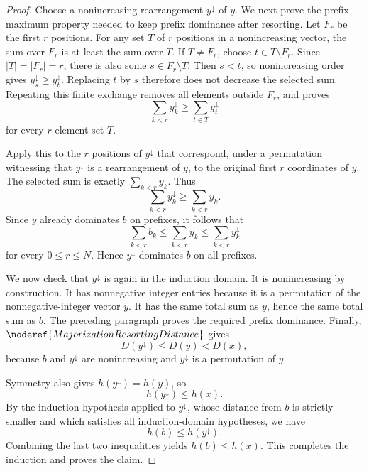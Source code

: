 \begin{proof}
Choose a nonincreasing rearrangement \(y^\downarrow\) of \(y\).  We next
prove the prefix-maximum property needed to keep prefix dominance after
resorting.  Let \(F_r\) be the first \(r\) positions.  For any set \(T\) of
\(r\) positions in a nonincreasing vector, the sum over \(F_r\) is at least
the sum over \(T\).  If \(T\ne F_r\), choose
\(t\in T\setminus F_r\).  Since \(|T|=|F_r|=r\), there is also some
\(s\in F_r\setminus T\).  Then \(s<t\), so nonincreasing order gives
\(y^\downarrow_s\ge y^\downarrow_t\).  Replacing \(t\) by \(s\) therefore
does not decrease the selected sum.  Repeating this finite exchange removes
all elements outside \(F_r\), and proves
\[
\sum_{k<r} y^\downarrow_k
\ge
\sum_{t\in T} y^\downarrow_t
\]
for every \(r\)-element set \(T\).

Apply this to the \(r\) positions of \(y^\downarrow\) that correspond, under
a permutation witnessing that \(y^\downarrow\) is a rearrangement of \(y\),
to the original first \(r\) coordinates of \(y\).  The selected sum is
exactly \(\sum_{k<r}y_k\).  Thus
\[
\sum_{k<r} y^\downarrow_k\ge \sum_{k<r} y_k.
\]
Since \(y\) already dominates \(b\) on prefixes, it follows that
\[
\sum_{k<r} b_k\le \sum_{k<r}y_k\le \sum_{k<r}y^\downarrow_k
\]
for every \(0\le r\le N\).  Hence \(y^\downarrow\) dominates \(b\) on all
prefixes.

We now check that \(y^\downarrow\) is again in the induction domain.  It is
nonincreasing by construction.  It has nonnegative integer entries because
it is a permutation of the nonnegative-integer vector \(y\).  It has the
same total sum as \(y\), hence the same total sum as \(b\).  The preceding
paragraph proves the required prefix dominance.  Finally,
\(\noderef{MajorizationResortingDistance}\) gives
\[
D(y^\downarrow)\le D(y)<D(x),
\]
because \(b\) and \(y^\downarrow\) are nonincreasing and
\(y^\downarrow\) is a permutation of \(y\).

Symmetry also gives \(h(y^\downarrow)=h(y)\), so
\[
h(y^\downarrow)\le h(x).
\]
By the induction hypothesis applied to \(y^\downarrow\), whose distance from
\(b\) is strictly smaller and which satisfies all induction-domain
hypotheses, we have
\[
h(b)\le h(y^\downarrow).
\]
Combining the last two inequalities yields \(h(b)\le h(x)\).  This completes
the induction and proves the claim.
\end{proof}
